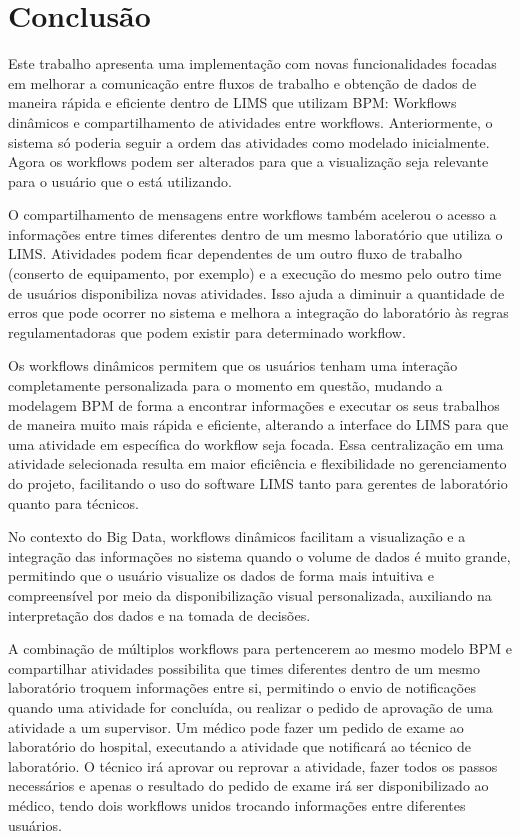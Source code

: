 \section{Conclusão}

Este trabalho apresenta uma implementação com novas funcionalidades focadas em melhorar a comunicação entre fluxos de trabalho e obtenção de dados de maneira rápida e eficiente dentro de LIMS que utilizam BPM: Workflows dinâmicos e compartilhamento de atividades entre workflows. Anteriormente, o sistema só poderia seguir a ordem das atividades como modelado inicialmente. Agora os workflows podem ser alterados para que a visualização seja relevante para o usuário que o está utilizando.

O compartilhamento de mensagens entre workflows também acelerou o acesso a informações entre times diferentes dentro de um mesmo laboratório que utiliza o LIMS. Atividades podem ficar dependentes de um outro fluxo de trabalho (conserto de equipamento, por exemplo) e a execução do mesmo pelo outro time de usuários disponibiliza novas atividades. Isso ajuda a diminuir a quantidade de erros que pode ocorrer no sistema e melhora a integração do laboratório às regras regulamentadoras que podem existir para determinado workflow.

Os workflows dinâmicos permitem que os usuários tenham uma interação completamente personalizada para o momento em questão, mudando a modelagem BPM de forma a encontrar informações e executar os seus trabalhos de maneira muito mais rápida e eficiente, alterando a interface do LIMS para que uma atividade em específica do workflow seja focada.
Essa centralização em uma atividade selecionada resulta em maior eficiência e flexibilidade no gerenciamento do projeto, facilitando o uso do software LIMS tanto para gerentes de laboratório quanto para técnicos.

No contexto do Big Data, workflows dinâmicos facilitam a visualização e a integração das informações no sistema quando o volume de dados é muito grande, permitindo que o usuário visualize os dados de forma mais intuitiva e compreensível por meio da disponibilização visual personalizada, auxiliando na interpretação dos dados e na tomada de decisões.

A combinação de múltiplos workflows para pertencerem ao mesmo modelo BPM e compartilhar atividades possibilita que times diferentes dentro de um mesmo laboratório troquem informações entre si, permitindo o envio de notificações quando uma atividade for concluída, ou realizar o pedido de aprovação de uma atividade a um supervisor. Um médico pode fazer um pedido de exame ao laboratório do hospital, executando a atividade que notificará ao técnico de laboratório. O técnico irá aprovar ou reprovar a atividade, fazer todos os passos necessários e apenas o resultado do pedido de exame irá ser disponibilizado ao médico, tendo dois workflows unidos trocando informações entre diferentes usuários.

